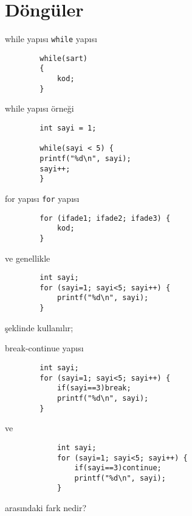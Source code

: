 \section{Döngüler}
\begin{frame}[fragile]{while yapısı}
    \lstinline{while} yapısı
    \begin{lstlisting}
        while(sart)
        {
            kod;
        }\end{lstlisting}
\end{frame}
\begin{frame}[fragile]{while yapısı örneği}
    \begin{lstlisting}
        int sayi = 1;

        while(sayi < 5) {
        printf("%d\n", sayi);
        sayi++;
        }\end{lstlisting}
\end{frame}
\begin{frame}[fragile]{for yapısı}
    \lstinline{for} yapısı
    \begin{lstlisting}
        for (ifade1; ifade2; ifade3) {
            kod;
        }\end{lstlisting}
    ve genellikle
    \begin{lstlisting}
        int sayi;
        for (sayi=1; sayi<5; sayi++) {
            printf("%d\n", sayi);
        }\end{lstlisting}
    şeklinde kullanılır;
\end{frame}
\begin{frame}[fragile]{break-continue yapısı}
    \begin{lstlisting}
        int sayi;
        for (sayi=1; sayi<5; sayi++) {
            if(sayi==3)break;
            printf("%d\n", sayi);
        }\end{lstlisting}
        ve
        \begin{lstlisting}
            int sayi;
            for (sayi=1; sayi<5; sayi++) {
                if(sayi==3)continue;
                printf("%d\n", sayi);
            }\end{lstlisting}
        arasındaki fark nedir?
\end{frame}
